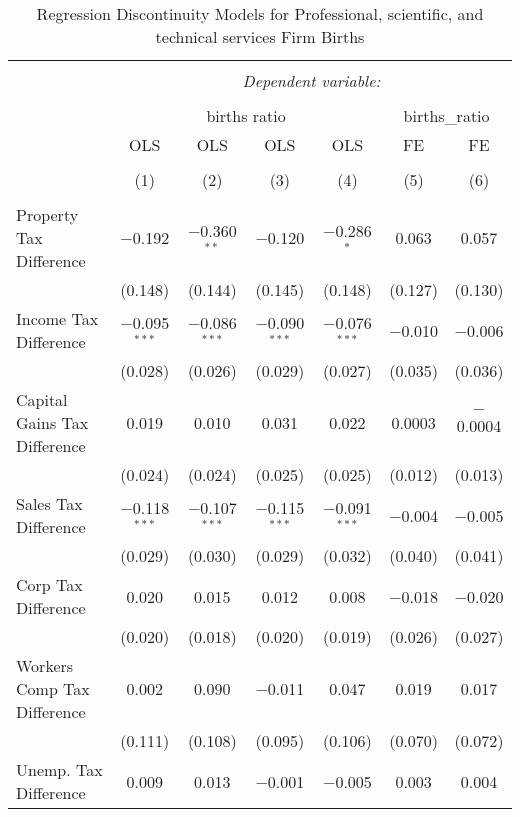 
\begin{table}[!htbp] \centering 
  \caption{Regression Discontinuity Models for  Professional, scientific, and technical services Firm Births} 
  \label{54rd} 
\begin{tabular}{@{\extracolsep{5pt}}lcccccc} 
\\[-1.8ex]\hline 
\hline \\[-1.8ex] 
 & \multicolumn{6}{c}{\textit{Dependent variable:}} \\ 
\cline{2-7} 
\\[-1.8ex] & \multicolumn{4}{c}{births ratio} & \multicolumn{2}{c}{births\_ratio} \\ 
 & OLS & OLS & OLS & OLS & FE & FE \\ 
\\[-1.8ex] & (1) & (2) & (3) & (4) & (5) & (6)\\ 
\hline \\[-1.8ex] 
 Property Tax Difference & $-$0.192 & $-$0.360$^{**}$ & $-$0.120 & $-$0.286$^{*}$ & 0.063 & 0.057 \\ 
  & (0.148) & (0.144) & (0.145) & (0.148) & (0.127) & (0.130) \\ 
  Income Tax Difference & $-$0.095$^{***}$ & $-$0.086$^{***}$ & $-$0.090$^{***}$ & $-$0.076$^{***}$ & $-$0.010 & $-$0.006 \\ 
  & (0.028) & (0.026) & (0.029) & (0.027) & (0.035) & (0.036) \\ 
  Capital Gains Tax Difference & 0.019 & 0.010 & 0.031 & 0.022 & 0.0003 & $-$0.0004 \\ 
  & (0.024) & (0.024) & (0.025) & (0.025) & (0.012) & (0.013) \\ 
  Sales Tax Difference & $-$0.118$^{***}$ & $-$0.107$^{***}$ & $-$0.115$^{***}$ & $-$0.091$^{***}$ & $-$0.004 & $-$0.005 \\ 
  & (0.029) & (0.030) & (0.029) & (0.032) & (0.040) & (0.041) \\ 
  Corp Tax Difference & 0.020 & 0.015 & 0.012 & 0.008 & $-$0.018 & $-$0.020 \\ 
  & (0.020) & (0.018) & (0.020) & (0.019) & (0.026) & (0.027) \\ 
  Workers Comp Tax Difference & 0.002 & 0.090 & $-$0.011 & 0.047 & 0.019 & 0.017 \\ 
  & (0.111) & (0.108) & (0.095) & (0.106) & (0.070) & (0.072) \\ 
  Unemp. Tax Difference & 0.009 & 0.013 & $-$0.001 & $-$0.005 & 0.003 & 0.004 \\ 

\end{tabular}
\end{table}
